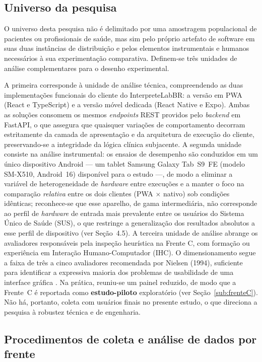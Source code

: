 \documentclass[12pt]{article}
\begin{document}
\subsection{Universo da pesquisa}

O universo desta pesquisa não é delimitado por uma amostragem populacional de pacientes ou profissionais de saúde, mas sim pelo próprio artefato de software em suas duas instâncias de distribuição e pelos elementos instrumentais e humanos necessários à sua experimentação comparativa. Definem-se três unidades de análise complementares para o desenho experimental.

A primeira corresponde à unidade de análise técnica, compreendendo as duas implementações funcionais do cliente do InterpreteLabBR: a versão em PWA (React e TypeScript) e a versão móvel dedicada (React Native e Expo). Ambas as soluções consomem os mesmos \emph{endpoints} REST providos pelo \emph{backend} em FastAPI, o que assegura que quaisquer variações de comportamento decorram estritamente da camada de apresentação e da arquitetura de execução do cliente, preservando-se a integridade da lógica clínica subjacente. A segunda unidade consiste na análise instrumental: os ensaios de desempenho são conduzidos em um único dispositivo Android --- um tablet Samsung Galaxy Tab~S9~FE (modelo SM-X510, Android~16) disponível para o estudo ---, de modo a eliminar a variável de heterogeneidade de \emph{hardware} entre execuções e a manter o foco na comparação \emph{relativa} entre os dois clientes (PWA $\times$ nativo) sob condições idênticas; reconhece-se que esse aparelho, de gama intermediária, não corresponde ao perfil de \emph{hardware} de entrada mais prevalente entre os usuários do Sistema Único de Saúde (SUS), o que restringe a generalização dos resultados absolutos a esse perfil de dispositivo (ver Seção~4.5). A terceira unidade de análise abrange os avaliadores responsáveis pela inspeção heurística na Frente C, com formação ou experiência em Interação Humano-Computador (IHC). O dimensionamento segue a faixa de três a cinco avaliadores recomendada por Nielsen (1994), suficiente para identificar a expressiva maioria dos problemas de usabilidade de uma interface gráfica \cite{nielsen1994}. Na prática, reuniu-se um painel reduzido, de modo que a Frente~C é reportada como \textbf{estudo-piloto} exploratório (ver Seção~\ref{sub:frenteC}). Não há, portanto, coleta com usuários finais no presente estudo, o que direciona a pesquisa à robustez técnica e de engenharia.

\subsection{Procedimentos de coleta e análise de dados por frente}
\end{document}
